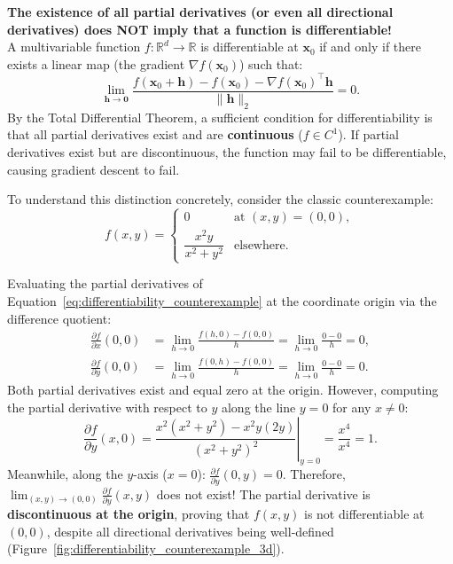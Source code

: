 \begin{examinsight}
\textbf{The existence of all partial derivatives (or even all directional derivatives) does NOT imply that a function is differentiable!}\\
A multivariable function $f: \mathbb{R}^d \to \mathbb{R}$ is differentiable at $\mathbf{x}_0$ if and only if there exists a linear map (the gradient $\nabla f(\mathbf{x}_0)$) such that:
\begin{equation}
\lim_{\mathbf{h} \to \mathbf{0}} \frac{f(\mathbf{x}_0 + \mathbf{h}) - f(\mathbf{x}_0) - \nabla f(\mathbf{x}_0)^\top \mathbf{h}}{\|\mathbf{h}\|_2} = 0.
\label{eq:frechet_differentiability}
\end{equation}
By the Total Differential Theorem, a sufficient condition for differentiability is that all partial derivatives exist and are \textbf{continuous} ($f \in C^1$). If partial derivatives exist but are discontinuous, the function may fail to be differentiable, causing gradient descent to fail.
\end{examinsight}

To understand this distinction concretely, consider the classic counterexample:
\begin{equation}
f(x, y) = \begin{cases} 0 & \text{at } (x, y) = (0, 0), \\ \dfrac{x^2 y}{x^2 + y^2} & \text{elsewhere}. \end{cases}
\label{eq:differentiability_counterexample}
\end{equation}

Evaluating the partial derivatives of Equation~\eqref{eq:differentiability_counterexample} at the coordinate origin via the difference quotient:
\begin{align}
\frac{\partial f}{\partial x}(0, 0) &= \lim_{h \to 0} \frac{f(h, 0) - f(0, 0)}{h} = \lim_{h \to 0} \frac{0 - 0}{h} = 0, \\
\frac{\partial f}{\partial y}(0, 0) &= \lim_{h \to 0} \frac{f(0, h) - f(0, 0)}{h} = \lim_{h \to 0} \frac{0 - 0}{h} = 0.
\end{align}
Both partial derivatives exist and equal zero at the origin. However, computing the partial derivative with respect to $y$ along the line $y = 0$ for any $x \ne 0$:
\begin{equation}
\frac{\partial f}{\partial y}(x, 0) = \left. \frac{x^2(x^2 + y^2) - x^2 y(2y)}{(x^2 + y^2)^2} \right|_{y=0} = \frac{x^4}{x^4} = 1.
\end{equation}
Meanwhile, along the $y$-axis ($x = 0$): $\frac{\partial f}{\partial y}(0, y) = 0$. Therefore, $\lim_{(x, y) \to (0, 0)} \frac{\partial f}{\partial y}(x, y)$ does not exist! The partial derivative is \textbf{discontinuous at the origin}, proving that $f(x, y)$ is not differentiable at $(0, 0)$, despite all directional derivatives being well-defined (Figure~\ref{fig:differentiability_counterexample_3d}).

